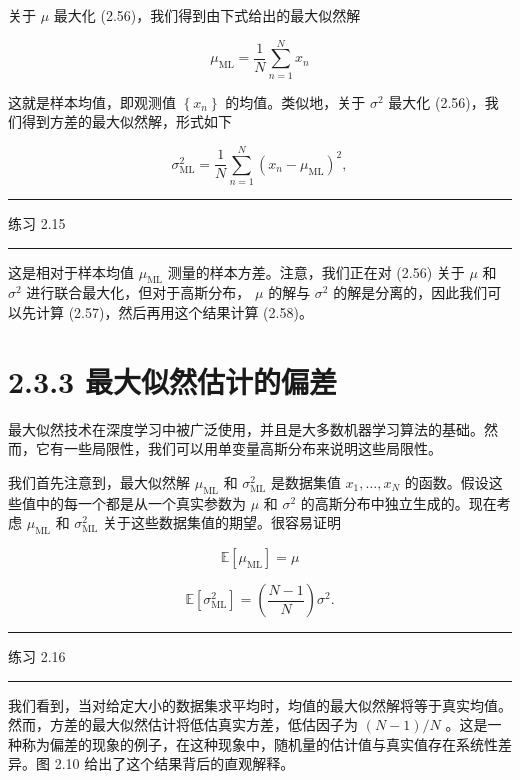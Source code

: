 \documentclass[10pt]{article}
\newcommand{\HRule}{\begin{center}\rule{0.9\linewidth}{0.2mm}\end{center}}
\begin{document}
关于 \(\mu\) 最大化 (2.56)，我们得到由下式给出的最大似然解

\[
{\mu }_{\mathrm{{ML}}} = \frac{1}{N}\mathop{\sum }\limits_{{n = 1}}^{N}{x}_{n} \tag{2.57}
\]

这就是样本均值，即观测值 \(\left\{  {x}_{n}\right\}\) 的均值。类似地，关于 \({\sigma }^{2}\) 最大化 (2.56)，我们得到方差的最大似然解，形式如下

\[
{\sigma }_{\mathrm{{ML}}}^{2} = \frac{1}{N}\mathop{\sum }\limits_{{n = 1}}^{N}{\left( {x}_{n} - {\mu }_{\mathrm{{ML}}}\right) }^{2}, \tag{2.58}
\]

\HRule

练习 2.15

\HRule

这是相对于样本均值 \({\mu }_{\mathrm{{ML}}}\) 测量的样本方差。注意，我们正在对 (2.56) 关于 \(\mu\) 和 \({\sigma }^{2}\) 进行联合最大化，但对于高斯分布， \(\mu\) 的解与 \({\sigma }^{2}\) 的解是分离的，因此我们可以先计算 (2.57)，然后再用这个结果计算 (2.58)。

\section*{2.3.3 最大似然估计的偏差}

最大似然技术在深度学习中被广泛使用，并且是大多数机器学习算法的基础。然而，它有一些局限性，我们可以用单变量高斯分布来说明这些局限性。

我们首先注意到，最大似然解 \({\mu }_{\mathrm{{ML}}}\) 和 \({\sigma }_{\mathrm{{ML}}}^{2}\) 是数据集值 \({x}_{1},\ldots ,{x}_{N}\) 的函数。假设这些值中的每一个都是从一个真实参数为 \(\mu\) 和 \({\sigma }^{2}\) 的高斯分布中独立生成的。现在考虑 \({\mu }_{\mathrm{{ML}}}\) 和 \({\sigma }_{\mathrm{{ML}}}^{2}\) 关于这些数据集值的期望。很容易证明

\[
\mathbb{E}\left\lbrack  {\mu }_{\mathrm{{ML}}}\right\rbrack   = \mu  \tag{2.59}
\]

\[
\mathbb{E}\left\lbrack  {\sigma }_{\mathrm{{ML}}}^{2}\right\rbrack   = \left( \frac{N - 1}{N}\right) {\sigma }^{2}. \tag{2.60}
\]

\HRule

练习 2.16

\HRule

我们看到，当对给定大小的数据集求平均时，均值的最大似然解将等于真实均值。然而，方差的最大似然估计将低估真实方差，低估因子为 \(\left( {N - 1}\right) /N\) 。这是一种称为偏差的现象的例子，在这种现象中，随机量的估计值与真实值存在系统性差异。图 2.10 给出了这个结果背后的直观解释。
\end{document}
